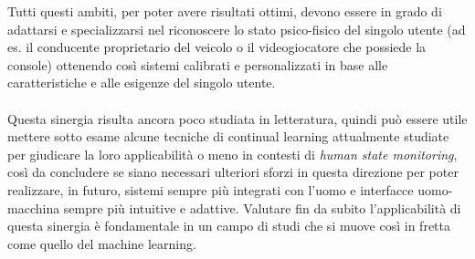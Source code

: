 Tutti questi ambiti, per poter avere risultati ottimi, devono essere in grado di adattarsi e specializzarsi nel riconoscere lo stato psico-fisico del singolo utente (ad es. il conducente proprietario del veicolo o il videogiocatore che possiede la console) ottenendo così sistemi calibrati e personalizzati in base alle caratteristiche e alle esigenze del singolo utente.\\\\
Questa sinergia risulta ancora poco studiata in letteratura, quindi può essere utile mettere sotto esame alcune tecniche di continual learning attualmente studiate per giudicare la loro applicabilità o meno in contesti di \textit{human state monitoring}, così da concludere se siano necessari ulteriori sforzi in questa direzione per poter realizzare, in futuro, sistemi sempre più integrati con l'uomo e interfacce uomo-macchina sempre più intuitive e adattive. Valutare fin da subito l'applicabilità di questa sinergia è fondamentale in un campo di studi che si muove così in fretta come quello del machine learning.

